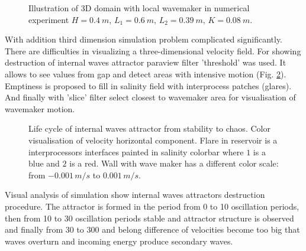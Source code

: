 \documentclass[a4wide,fontsize=12pt]{article}
\begin{document}
\begin{figure}
    \caption{Illustration of 3D domain with local wavemaker in numerical experiment $H=0.4\ m$, $L_1 = 0.6\ m$, $L_2 = 0.39\ m$, $K=0.08 \ m$.}
    \label{fig:3DLocSctarch}
\end{figure}

With addition third dimension simulation problem complicated significantly. There are difficulties in visualizing a three-dimensional velocity field. For showing destruction of internal waves attractor paraview filter 'threshold' was used. It allows to see values from gap and detect areas with intensive motion (Fig. \ref{fig:3DLocTurbRes}). Emptiness is proposed to fill in salinity field with interprocess patches (glares). And finally with 'slice' filter select closest to wavemaker area for visualisation of wavemaker motion. 



\begin{figure}[!ht]
\centering
    \begin{minipage}{0.45\textwidth}
        \centering
        \label{fig:3DTurbBegin}
    \end{minipage}
    \begin{minipage}{0.45\textwidth}
        \centering
        \label{fig:3DTurbEnd}
    \end{minipage}
    \caption{Life cycle of internal waves attractor from stability to chaos. Color visualisation of velocity horizontal component. Flare in reservoir is a interprocessors interfaces painted in salinity colorbar where $1$ is a blue and $2$ is a red. Wall with wave maker has a different color scale: from $-0.001\,m/s$ to $0.001\,m/s$.}
    \label{fig:3DLocTurbRes}
\end{figure}

    Visual analysis of simulation show internal waves attractors destruction procedure. The attractor is formed in the period from 0 to 10 oscillation periods, then from 10 to 30 oscillation periods stable and attractor structure is observed and finally from 30 to 300 and belong difference of velocities become too big that waves overturn and incoming energy produce secondary waves.
\end{document}
